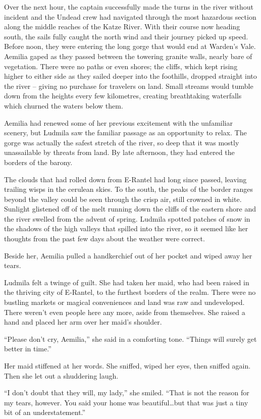 Over the next hour, the captain successfully made the turns in the river without incident and the Undead crew had navigated through the most hazardous section along the middle reaches of the Katze River. With their course now heading south, the sails fully caught the north wind and their journey picked up speed. Before noon, they were entering the long gorge that would end at Warden’s Vale. Aemilia gaped as they passed between the towering granite walls, nearly bare of vegetation. There were no paths or even shores; the cliffs, which kept rising higher to either side as they sailed deeper into the foothills, dropped straight into the river – giving no purchase for travelers on land. Small streams would tumble down from the heights every few kilometres, creating breathtaking waterfalls which churned the waters below them.

 

Aemilia had renewed some of her previous excitement with the unfamiliar scenery, but Ludmila saw the familiar passage as an opportunity to relax. The gorge was actually the safest stretch of the river, so deep that it was mostly unassailable by threats from land. By late afternoon, they had entered the borders of the barony.

 

The clouds that had rolled down from E-Rantel had long since passed, leaving trailing wisps in the cerulean skies. To the south, the peaks of the border ranges beyond the valley could be seen through the crisp air, still crowned in white. Sunlight glistened off of the melt running down the cliffs of the eastern shore and the river swelled from the advent of spring. Ludmila spotted patches of snow in the shadows of the high valleys that spilled into the river, so it seemed like her thoughts from the past few days about the weather were correct.

 

Beside her, Aemilia pulled a handkerchief out of her pocket and wiped away her tears.

 

Ludmila felt a twinge of guilt. She had taken her maid, who had been raised in the thriving city of E-Rantel, to the furthest borders of the realm. There were no bustling markets or magical conveniences and land was raw and undeveloped. There weren’t even people here any more, aside from themselves. She raised a hand and placed her arm over her maid’s shoulder.

 

“Please don’t cry, Aemilia,” she said in a comforting tone. “Things will surely get better in time.”

 

Her maid stiffened at her words. She sniffed, wiped her eyes, then sniffed again. Then she let out a shuddering laugh.


“I don’t doubt that they will, my lady,” she smiled. “That is not the reason for my tears, however. You said your home was beautiful…but that was just a tiny bit of an understatement.”